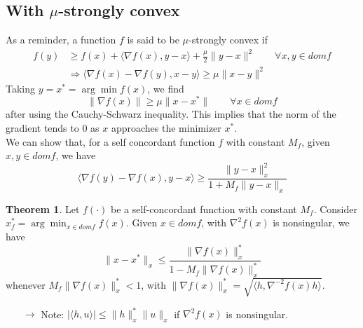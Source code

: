\documentclass[12pt, openany]{report}
\theoremstyle{definition}
\newtheorem{thm}{Theorem}[chapter]
\begin{document}
\subsection{With \texorpdfstring{$\mu$} --strongly convex}
As a reminder, a function $f$ is said to be $\mu$-strongly convex if
\begin{equation}
	\begin{aligned}
		f(y)&\ge f(x) + \langle \nabla f(x),y-x\rangle + \frac{\mu}{2}\|y-x\|^2 \qquad \forall x,y\in domf\\
		&\Rightarrow \langle \nabla f(x)-\nabla f(y),x-y\rangle \ge \mu \|x-y\|^2
	\end{aligned}
\end{equation}
Taking $y=x^*=\arg\min f(x)$, we find 
\begin{equation}
	\|\nabla f(x)\| \ge \mu \|x-x^*\| \qquad \forall x\in domf
\end{equation}
after using the Cauchy-Schwarz inequality. This implies that the norm of the gradient tends to 0 as $x$ approaches the minimizer $x^*$.\\
We can show that, for a self concordant function $f$ with constant $M_f$, given $x,y\in domf$, we have 
\begin{equation}\label{eq:sc}
	\langle \nabla f(y)-\nabla f(x),y-x\rangle \ge \frac{\|y-x\|_x^2}{1+M_f\|y-x\|_x}
\end{equation}
\begin{thm}
	Let $f(\cdot)$ be a self-concordant function with constant $M_f$. Consider $x_f^* = \arg\min_{x\in domf}f(x)$. Given $x\in domf$, with $\nabla^2 f(x)$ is nonsingular, we have 
	\begin{equation}\label{eq:sc2}
		\|x-x^*\|_x \le \frac{\|\nabla f(x)\|_x^*}{1-M_f\|\nabla f(x)\|_x^*}
	\end{equation}
	whenever $M_f\|\nabla f(x)\|_x^* < 1$, with $\|\nabla f(x)\|_x^* = \sqrt{\langle h, \nabla^{-2}f(x)h\rangle}$.
\end{thm}
\begin{itemize}
	\item [$\to$] Note: $|\langle h,u\rangle| \le \|h\|_x^* \|u\|_x$ if $\nabla^2 f(x)$ is nonsingular.
\end{itemize}
\end{document}
